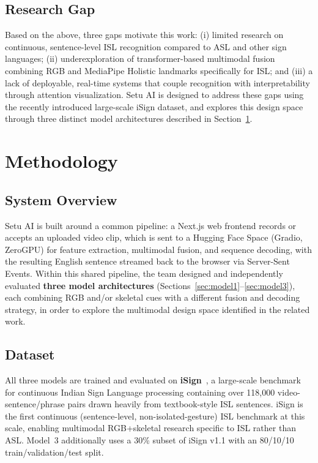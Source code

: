 \documentclass[pdflatex,sn-mathphys-num]{sn-jnl}
\begin{document}
\subsection{Research Gap}
Based on the above, three gaps motivate this work: (i) limited research on continuous, sentence-level ISL recognition compared to ASL and other sign languages; (ii) underexploration of transformer-based multimodal fusion combining RGB and MediaPipe Holistic landmarks specifically for ISL; and (iii) a lack of deployable, real-time systems that couple recognition with interpretability through attention visualization. Setu AI is designed to address these gaps using the recently introduced large-scale iSign dataset, and explores this design space through three distinct model architectures described in Section~\ref{sec:methodology}.

\section{Methodology}\label{sec:methodology}

\subsection{System Overview}
Setu AI is built around a common pipeline: a Next.js web frontend records or accepts an uploaded video clip, which is sent to a Hugging Face Space (Gradio, ZeroGPU) for feature extraction, multimodal fusion, and sequence decoding, with the resulting English sentence streamed back to the browser via Server-Sent Events. Within this shared pipeline, the team designed and independently evaluated \textbf{three model architectures} (Sections~\ref{sec:model1}--\ref{sec:model3}), each combining RGB and/or skeletal cues with a different fusion and decoding strategy, in order to explore the multimodal design space identified in the related work.

\subsection{Dataset}
All three models are trained and evaluated on \textbf{iSign}~\cite{isign}, a large-scale benchmark for continuous Indian Sign Language processing containing over 118,000 video-sentence/phrase pairs drawn heavily from textbook-style ISL sentences. iSign is the first continuous (sentence-level, non-isolated-gesture) ISL benchmark at this scale, enabling multimodal RGB+skeletal research specific to ISL rather than ASL. Model~3 additionally uses a 30\% subset of iSign v1.1 with an 80/10/10 train/validation/test split.
\end{document}
